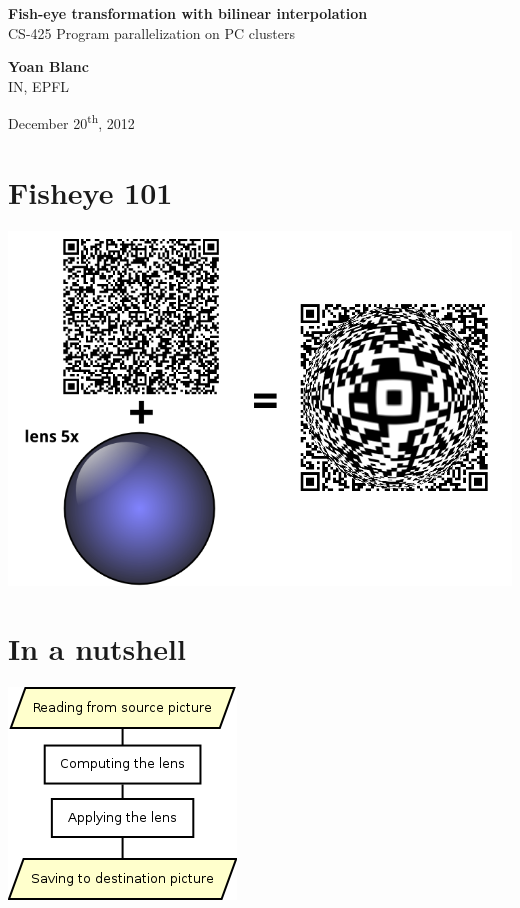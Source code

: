 \documentclass[12pt]{article}
\def\nameTitle{Yoan Blanc}
\def\affiliationTitle{IN, EPFL}
\def\placeAndDayTitle{December 20\textsuperscript{th}, 2012}
\def\presentationTitle{Fish-eye transformation with bilinear interpolation}
\def\presentationSubTitle{CS-425 Program parallelization on PC clusters}
\begin{document}
%


\vspace{3cm}

\raggedright \textcolor{Title}{\LARGE\bf \presentationTitle} \\[3mm]
\textcolor{Title}{\presentationSubTitle}

\vspace{2cm}

\raggedright {\bf \nameTitle} \\[2mm]
{\small\affiliationTitle}
\vspace{2cm}

\raggedright {\small \placeAndDayTitle}

\thispagestyle{empty}

\section{Fisheye 101}
\begin{center}
\includegraphics[width=.8\textwidth]{../figures/101.png}
\end{center}

\section{In a nutshell}
\begin{center}
\includegraphics{../figures/serial.png}
\end{center}
\end{document}

